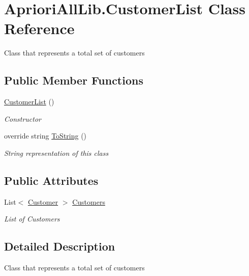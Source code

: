\hypertarget{class_apriori_all_lib_1_1_customer_list}{\section{Apriori\-All\-Lib.\-Customer\-List Class Reference}
\label{class_apriori_all_lib_1_1_customer_list}
}


Class that represents a total set of customers  


\subsection*{Public Member Functions}
\begin{DoxyCompactItemize}
\item 
\hyperlink{class_apriori_all_lib_1_1_customer_list_abaf21c0d33a87db3cf61e0c0741a6d44}{Customer\-List} ()
\begin{DoxyCompactList}\small\item\em Constructor \end{DoxyCompactList}\item 
override string \hyperlink{class_apriori_all_lib_1_1_customer_list_a8f3853844dc1e35424a54e706014f8d7}{To\-String} ()
\begin{DoxyCompactList}\small\item\em String representation of this class \end{DoxyCompactList}\end{DoxyCompactItemize}
\subsection*{Public Attributes}
\begin{DoxyCompactItemize}
\item 
List$<$ \hyperlink{class_apriori_all_lib_1_1_customer}{Customer} $>$ \hyperlink{class_apriori_all_lib_1_1_customer_list_a4fd2a16a984844e61ffc60b327e6534a}{Customers}
\begin{DoxyCompactList}\small\item\em List of Customers \end{DoxyCompactList}\end{DoxyCompactItemize}


\subsection{Detailed Description}
Class that represents a total set of customers 



